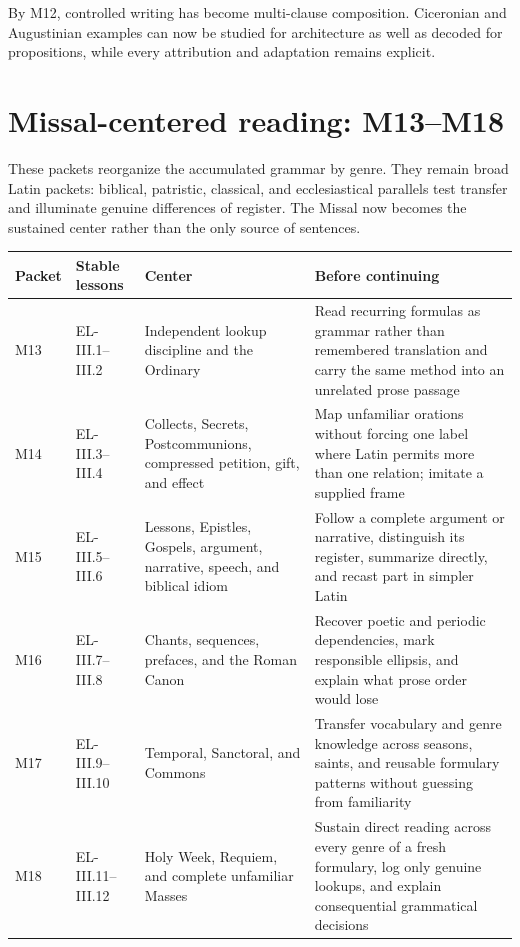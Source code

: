 By M12, controlled writing has become multi-clause composition. Ciceronian and
Augustinian examples can now be studied for architecture as well as decoded
for propositions, while every attribution and adaptation remains explicit.

\section{Missal-centered reading: M13--M18}

These packets reorganize the accumulated grammar by genre. They remain broad
Latin packets: biblical, patristic, classical, and ecclesiastical parallels
test transfer and illuminate genuine differences of register. The Missal now
becomes the sustained center rather than the only source of sentences.

\begin{xltabular}{\linewidth}{@{}P{0.55in}P{1.1in}P{2.0in}Y@{}}
  \toprule
  \textbf{Packet} & \textbf{Stable lessons} & \textbf{Center} & \textbf{Before continuing} \\
  \midrule\endhead
  M13 & EL-III.1--III.2 & Independent lookup discipline and the Ordinary &
  Read recurring formulas as grammar rather than remembered translation and
  carry the same method into an unrelated prose passage \\
  M14 & EL-III.3--III.4 & Collects, Secrets, Postcommunions, compressed
  petition, gift, and effect & Map unfamiliar orations without forcing one
  label where Latin permits more than one relation; imitate a supplied frame \\
  M15 & EL-III.5--III.6 & Lessons, Epistles, Gospels, argument, narrative,
  speech, and biblical idiom & Follow a complete argument or narrative,
  distinguish its register, summarize directly, and recast part in simpler
  Latin \\
  M16 & EL-III.7--III.8 & Chants, sequences, prefaces, and the Roman Canon &
  Recover poetic and periodic dependencies, mark responsible ellipsis, and
  explain what prose order would lose \\
  M17 & EL-III.9--III.10 & Temporal, Sanctoral, and Commons & Transfer
  vocabulary and genre knowledge across seasons, saints, and reusable
  formulary patterns without guessing from familiarity \\
  M18 & EL-III.11--III.12 & Holy Week, Requiem, and complete unfamiliar Masses
  & Sustain direct reading across every genre of a fresh formulary, log only
  genuine lookups, and explain consequential grammatical decisions \\
  \bottomrule
\end{xltabular}

